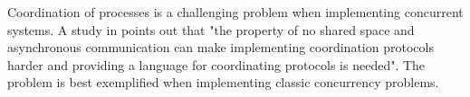  






 Coordination of processes is a challenging problem when implementing concurrent systems.
A study in \cite{ActorCoordinationStudy} points out that "the property of no shared space and asynchronous
communication can make implementing coordination protocols harder and providing a language
for coordinating protocols is needed". The problem is best exemplified when implementing classic concurrency problems.

